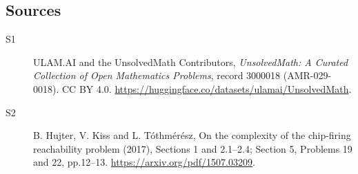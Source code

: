 \documentclass[11pt]{article}
\begin{document}
\subsection{Sources}
\begin{description}
\item[\hypertarget{source:3000018:1}{S1}] ULAM.AI and the UnsolvedMath Contributors, \emph{UnsolvedMath: A Curated Collection of Open Mathematics Problems}, record 3000018 (AMR-029-0018). CC BY 4.0. \url{https://huggingface.co/datasets/ulamai/UnsolvedMath}.
\item[\hypertarget{source:3000018:2}{S2}] B. Hujter, V. Kiss and L. Tóthmérész, On the complexity of the chip-firing reachability problem (2017), Sections 1 and 2.1--2.4; Section 5, Problems 19 and 22, pp.12--13. \url{https://arxiv.org/pdf/1507.03209}.
\end{description}
\label{end:3000018}
\end{document}
